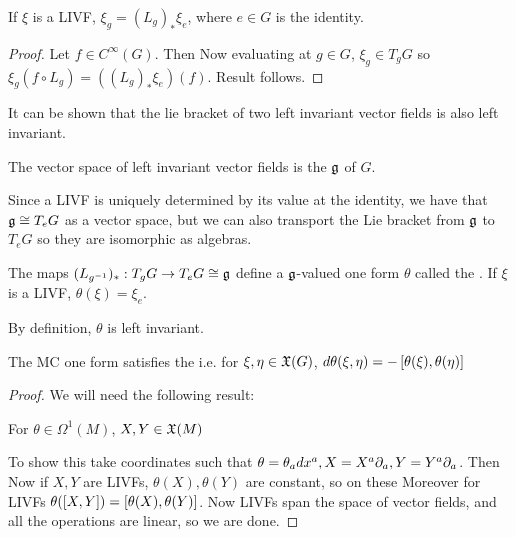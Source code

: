 \documentclass{article}
\begin{document}
\begin{lemma}
	If $\xi$ is a LIVF, $\xi_g = (L_g)_\ast \xi_e$, where $e\in G$ is the identity.
\end{lemma}
\begin{proof}
	Let $f \in C^\infty(G)$. Then
	Now evaluating at $g \in G$, $\xi_g \in T_gG$ so $\xi_g(f \circ L_g)= ((L_g)_\ast \xi_e)(f)$. Result follows. 
\end{proof}

It can be shown that the lie bracket of two left invariant vector fields is also left invariant. 
\begin{definition}
	The vector space of left invariant vector fields is the  $\mf{g}$ of $G$. 
\end{definition}
Since a LIVF is uniquely determined by its value at the identity, we have that $\mf{g} \cong T_e G$ as a vector space, but we can also transport the Lie bracket from $\mf{g}$ to $T_e G$ so they are isomorphic as algebras. 
\begin{definition}
	The maps $(L_{g^{-1}})_\ast : T_g G \to T_e G \cong \mf{g}$ define a $\mf{g}$-valued one form $\theta$ called the . If $\xi$ is a LIVF, $\theta(\xi) = \xi_e$. 
\end{definition}
By definition, $\theta$ is left invariant. 
\begin{theorem}
	The MC one form satisfies the  
	i.e. for $\xi,\eta \in \mf{X}(G)$, $d\theta(\xi,\eta) = -\comm[\theta(\xi)]{\theta(\eta)}$
\end{theorem}
\begin{proof}
	We will need the following result:
	\begin{claim}
		For $\theta \in \Omega^1(M)$, $X,Y \in \mf{X}(M)$
	\end{claim}
	To show this take coordinates such that $\theta = \theta_a dx^a, X = X^a \del_a, Y=Y^a \del_a$. Then 
	Now if $X,Y$ are LIVFs, $\theta(X), \theta(Y)$ are constant, so on these 
	Moreover for LIVFs $\theta(\comm[X]{Y}) = \comm[\theta(X)]{\theta(Y)}$. Now LIVFs span the space of vector fields, and all the operations are linear, so we are done. 
\end{proof}
\end{document}
